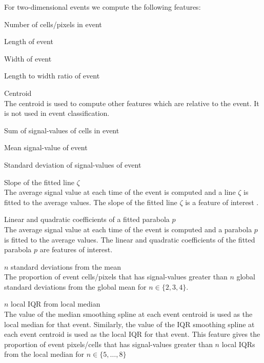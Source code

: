 \documentclass[a4paper,11pt]{article}
\begin{document}
For two-dimensional events we compute the following features:
\begin{compactenum}
	\item Number of cells/pixels in event
	\item Length of event
	\item Width of event
	\item Length to width ratio of event
	\item Centroid \\
	      The centroid is used to compute other features which are relative to the event. It is not used in event classification.
	\item Sum of signal-values of cells in event
	\item Mean signal-value of event
	\item Standard deviation of signal-values of event
	\item Slope of the fitted line $\zeta$ \\
	      The average signal value at each time of the event is computed and a line $\zeta$ is fitted to the average values. The slope of the fitted line $\zeta$ is a feature of interest .
	\item Linear and quadratic coefficients of a fitted parabola $p$ \\
	      The average signal value at each time of the event is computed and a parabola $p$ is fitted to the average values. The linear and quadratic coefficients of the fitted parabola $p$ are features of interest.
	\item $n$ standard deviations from the mean \\
	      The proportion of event cells/pixels that has signal-values greater than $n$ global standard deviations from the global mean for $n \in \{2, 3, 4\}$.
	\item $n$ local IQR from local median \\
	      The value of the median smoothing spline at each event centroid is used as the local median for that event. Similarly, the value of the IQR smoothing spline at each event centroid is used as the local IQR for that event. This feature gives the proportion of event pixels/cells that has signal-values greater than $n$ local IQRs from the local median for $n \in \{ 5, \dots, 8 \} $

\end{compactenum}
\end{document}
